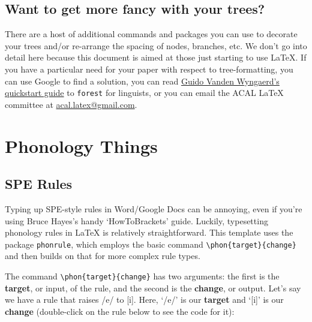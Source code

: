 \documentclass[output=paper,colorlinks,citecolor=brown,
]{langscibook}
\begin{document}

\subsection{Want to get more fancy with your trees?}

There are a host of additional commands and packages you can use to decorate your trees and/or re-arrange the spacing of nodes, branches, etc. We don't go into detail here because this document is aimed at those just starting to use \LaTeX{}. If you have a particular need for your paper with respect to tree-formatting, you can use Google to find a solution, you can read \href{http://mirrors.ibiblio.org/CTAN/info/forest-quickstart/ForestQuickstart.pdf}{Guido Vanden Wyngaerd's quickstart guide} to \texttt{forest} for linguists, or you can email the ACAL \LaTeX{} committee at \href{mailto:acal.latex@gmail.com}{acal.latex@gmail.com}.

\section{Phonology Things} \label{sec:diercks:Phonology}

\subsection{SPE Rules}
Typing up SPE-style rules in Word/Google Docs can be annoying, even if you're using Bruce Hayes's handy `HowToBrackets' guide. Luckily, typesetting phonology rules in \LaTeX{} is relatively straightforward. This template uses the package \texttt{phonrule}, which employs the basic command \verb|\phon{target}{change}| and then builds on that for more complex rule types. 

The command \verb|\phon{target}{change}| has two arguments: the first is the \textbf{target}, or input, of the rule, and the second is the \textbf{change}, or output. Let's say we have a rule that raises /e/ to [i]. Here, `/e/' is our \textbf{target} and `[i]' is our \textbf{change} (double-click on the rule below to see the code for it):

\end{document}
